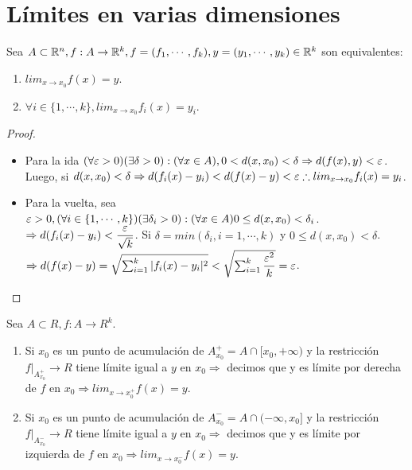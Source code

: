 \section{Límites en varias dimensiones}
\begin{prop}
  Sea $A \subset \mathbb{R}^n, f: A \to \mathbb{R}^k, f=(f_1, \cdots, f_k), y = (y_1, \cdots, y_k) \in \mathbb{R}^k$ son equivalentes:
  \begin{enumerate}
    \item $lim_{x \to x_0} f(x) = y$. 
    \item $\forall i \in \{1, \cdots, k\}, lim_{x \to x_0} f_i(x) = y_i$.
  \end{enumerate}
  \begin{proof}
    \begin{itemize}
      \item Para la ida $(\forall \varepsilon > 0)(\exists \delta > 0) : (\forall x \in A), 0 < d(x, x_0) < \delta \Rightarrow d(f(x), y) < \varepsilon$. Luego, si $d(x, x_0) < \delta \Rightarrow d(f_i(x) - y_i) < d(f(x) - y) < \varepsilon \therefore lim_{x \to x_0} f_i(x) = y_i$.
      \item Para la vuelta, sea $\varepsilon > 0, (\forall i \in \{1, \cdots, k\})(\exists \delta_i > 0) : (\forall x \in A) 0 \leq d(x, x_0) < \delta_i$. \\
    $\Rightarrow d(f_i(x) - y_i) < \dfrac{\varepsilon}{\sqrt{k}}$. Si $\delta = min(\delta_i, i = 1, \cdots, k)$ y $0 \leq d(x, x_0) < \delta$.
    $\Rightarrow d(f(x) - y) = \sqrt{\sum_{i = 1}^k | f_i(x) - y_i |^2 } < \sqrt{\sum_{i = 1}^k \dfrac{\varepsilon^2}{k}} = \varepsilon$.
    \end{itemize}
  \end{proof}
\end{prop}

\begin{definition}
  Sea $A \subset R, f: A \to R^k$.
  \begin{enumerate}
    \item Si $x_0$ es un punto de acumulación de $A_{x_0}^{+} = A \cap [x_0, +\infty)$ y la restricción $f|_{A_{x_0}^{+}} \to R$ tiene límite igual a $y$ en $x_0 \Rightarrow$ decimos que y es límite por derecha de $f$ en $x_0 \Rightarrow lim_{x \to x_0^+} f(x) = y$.
    \item Si $x_0$ es un punto de acumulación de $A_{x_0}^{-} = A \cap (-\infty, x_0]$ y la restricción $f|_{A_{x_0}^{-}} \to R$ tiene límite igual a $y$ en $x_0 \Rightarrow$ decimos que y es límite por izquierda de $f$ en $x_0 \Rightarrow lim_{x \to x_0^-} f(x) = y$.
  \end{enumerate}
\end{definition}

